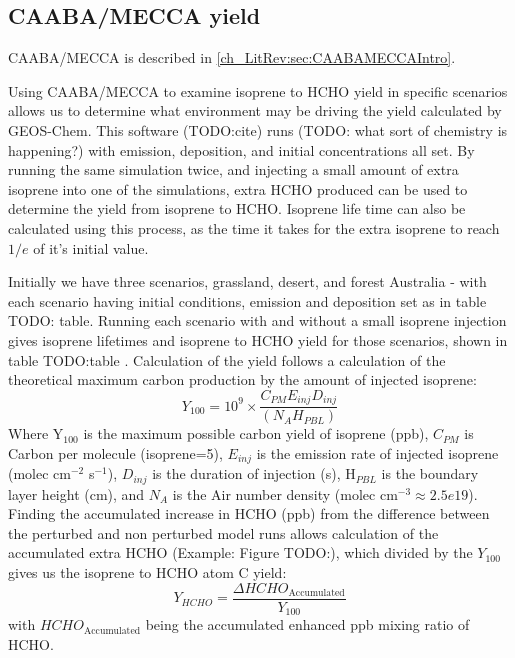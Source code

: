   \subsection{CAABA/MECCA yield}
  \label{Ch_isop:sec:CAABAMECCA}
    CAABA/MECCA is described in \ref{ch_LitRev:sec:CAABAMECCAIntro}.
    
    Using CAABA/MECCA to examine isoprene to HCHO yield in specific scenarios allows us to determine what environment may be driving the yield calculated by GEOS-Chem.
    This software (TODO:cite) runs (TODO: what sort of chemistry is happening?) with emission, deposition, and initial concentrations all set.
    By running the same simulation twice, and injecting a small amount of extra isoprene into one of the simulations, extra HCHO produced can be used to determine the yield from isoprene to HCHO.
    Isoprene life time can also be calculated using this process, as the time it takes for the extra isoprene to reach $1/e$ of it's initial value.
    
    Initially we have three scenarios, grassland, desert, and forest Australia - with each scenario having initial conditions, emission and deposition set as in table TODO: table.
    Running each scenario with and without a small isoprene injection gives isoprene lifetimes and isoprene to HCHO yield for those scenarios, shown in table TODO:table .
    Calculation of the yield follows a calculation of the theoretical maximum carbon production by the amount of injected isoprene:
    \begin{equation}
      Y_{100} =10^9 \times \frac{C_{PM} E_{inj} D_{inj}}{(N_A H_{PBL})}
    \end{equation}
    Where Y$_{100}$ is the maximum possible carbon yield of isoprene (ppb), $C_{PM}$ is Carbon per molecule (isoprene=5), $E_{inj}$ is the emission rate of injected isoprene (molec cm$^{-2}$ s$^{-1}$), $D_{inj}$ is the duration of injection (s), H$_{PBL}$ is the boundary layer height (cm), and $N_A$ is the Air number density (molec cm$^{-3} \approx 2.5e19$).
    Finding the accumulated increase in HCHO (ppb) from the difference between the perturbed and non perturbed model runs allows calculation of the accumulated extra HCHO (Example: Figure TODO:), which divided by the $Y_{100}$ gives us the isoprene to HCHO atom C yield:
    \begin{equation}
      Y_{HCHO}= \frac{\Delta HCHO_{\text{Accumulated}}}{Y_{100}}
    \end{equation}
    with $HCHO_{\text{Accumulated}}$ being the accumulated enhanced ppb mixing ratio of HCHO.
    
